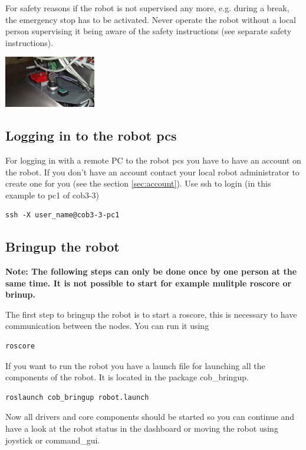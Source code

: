 For safety reasons if the robot is not supervised any more, e.g. during a break, the emergency stop has to be activated. Never operate the robot without a local person supervising it being aware of the safety instructions (see separate safety instructions).

\begin{center}
\includegraphics[width=0.3\textwidth]{images/key.png}
\end{center}


\subsection{Logging in to the robot pcs}
For logging in with a remote PC to the robot pcs you have to have an account on the robot. If you don't have an account contact your local robot administrator to create one for you (see the section \ref{sec:account}). Use ssh to login (in this example to pc1 of cob3-3)

\begin{lstlisting}
ssh -X user_name@cob3-3-pc1
\end{lstlisting}

\subsection{Bringup the robot}
\textbf{Note: The following steps can only be done once by one person at the same time. It is not possible to start for example mulitple roscore or brinup.}

The first step to bringup the robot is to start a roscore, this is necessary to have communication between the nodes. You can run it using
\begin{lstlisting}
roscore
\end{lstlisting}

If you want to run the robot you have a launch file for launching all the components of the robot. It is located in the package cob\_bringup.
\begin{lstlisting}
roslaunch cob_bringup robot.launch
\end{lstlisting}

Now all drivers and core components should be started so you can continue and have a look at the robot status in the dashboard or moving the robot using joystick or command\_gui.

